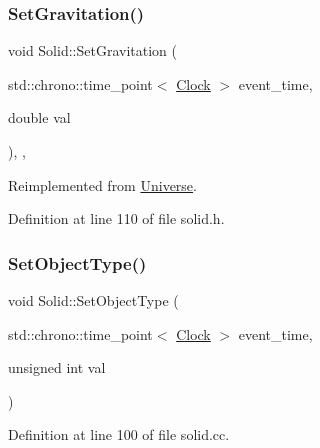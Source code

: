 \subsubsection{\texorpdfstring{Set\+Gravitation()}{SetGravitation()}}
{\footnotesize\ttfamily void Solid\+::\+Set\+Gravitation (\begin{DoxyParamCaption}\item[{std\+::chrono\+::time\+\_\+point$<$ \hyperlink{universe_8h_a0ef8d951d1ca5ab3cfaf7ab4c7a6fd80}{Clock} $>$}]{event\+\_\+time,  }\item[{double}]{val }\end{DoxyParamCaption})\hspace{0.3cm}{\ttfamily [inline]}, {\ttfamily [final]}, {\ttfamily [virtual]}}



Reimplemented from \hyperlink{class_universe_ae0cb8d86b2fbb8396d605160344b42f5}{Universe}.



Definition at line 110 of file solid.\+h.

\mbox{\label{class_solid_af6fe46af0be9a9533e114b1c0f186bfc}} 
\subsubsection{\texorpdfstring{Set\+Object\+Type()}{SetObjectType()}}
{\footnotesize\ttfamily void Solid\+::\+Set\+Object\+Type (\begin{DoxyParamCaption}\item[{std\+::chrono\+::time\+\_\+point$<$ \hyperlink{universe_8h_a0ef8d951d1ca5ab3cfaf7ab4c7a6fd80}{Clock} $>$}]{event\+\_\+time,  }\item[{unsigned int}]{val }\end{DoxyParamCaption})}



Definition at line 100 of file solid.\+cc.

